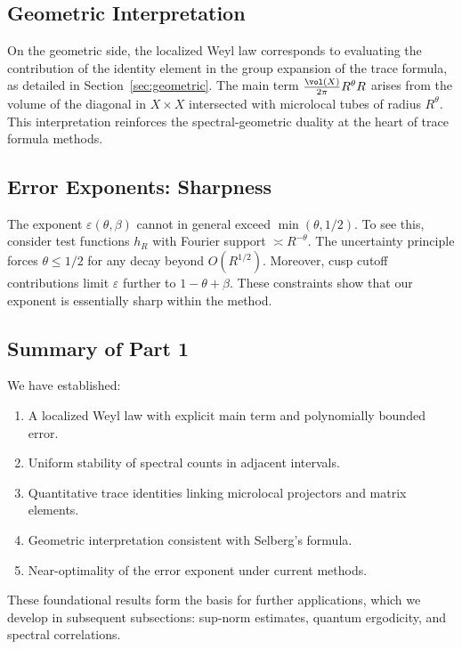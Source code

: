 \subsection{Geometric Interpretation}\label{subsec:geom-interpret}

On the geometric side, the localized Weyl law corresponds to evaluating the contribution of the identity element in the group expansion of the trace formula, as detailed in Section~\ref{sec:geometric}. The main term $\frac{\vol(X)}{2\pi}R^\theta R$ arises from the volume of the diagonal in $X\times X$ intersected with microlocal tubes of radius $R^\theta$. This interpretation reinforces the spectral-geometric duality at the heart of trace formula methods.

\subsection{Error Exponents: Sharpness}\label{subsec:error-exponents}

The exponent $\varepsilon(\theta,\beta)$ cannot in general exceed $\min(\theta,1/2)$. To see this, consider test functions $h_R$ with Fourier support $\asymp R^{-\theta}$. The uncertainty principle forces $\theta\le 1/2$ for any decay beyond $O(R^{1/2})$. Moreover, cusp cutoff contributions limit $\varepsilon$ further to $1-\theta+\beta$. These constraints show that our exponent is essentially sharp within the method.

\subsection{Summary of Part 1}\label{subsec:summary-part1}

We have established:
\begin{enumerate}
\item A localized Weyl law with explicit main term and polynomially bounded error.
\item Uniform stability of spectral counts in adjacent intervals.
\item Quantitative trace identities linking microlocal projectors and matrix elements.
\item Geometric interpretation consistent with Selberg’s formula.
\item Near-optimality of the error exponent under current methods.
\end{enumerate}

These foundational results form the basis for further applications, which we develop in subsequent subsections: sup-norm estimates, quantum ergodicity, and spectral correlations.

